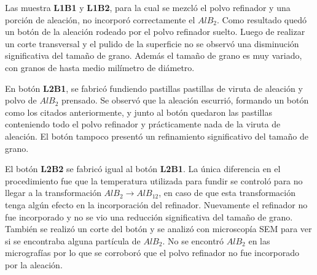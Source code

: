 \documentclass[a4paper,12pt,fleqn,twoside,openany]{book}
\begin{document}
Las muestra\textbf{ L1B1} y \textbf{L1B2}, para la cual se mezcló el polvo refinador y una porción de aleación, no incorporó correctamente el $AlB_2$. Como resultado quedó un botón de la aleación rodeado por el polvo refinador suelto. Luego de realizar un corte transversal y el pulido de la superficie no se observó una disminución significativa del tamaño de grano. Además el tamaño de grano es muy variado, con granos de hasta medio milímetro de diámetro.  

En botón \textbf{L2B1}, se fabricó fundiendo pastillas pastillas de viruta de aleación y polvo de $AlB_2$ prensado. Se observó que la aleación escurrió, formando un botón como los citados anteriormente, y junto al botón quedaron las pastillas conteniendo todo el polvo refinador y prácticamente nada de la viruta de aleación. El botón tampoco presentó un refinamiento significativo del tamaño de grano.

El botón \textbf{L2B2} se fabricó igual al botón \textbf{L2B1}. La única diferencia en el procedimiento fue que la temperatura utilizada para fundir se controló para no llegar a la transformación $AlB_2 \rightarrow AlB_{12}$, en caso de que esta transformación tenga algún efecto en la incorporación del refinador. Nuevamente el refinador no fue incorporado y no se vio una reducción significativa del tamaño de grano. También se realizó un corte del botón y se analizó con microscopía SEM para ver si se encontraba alguna partícula de $AlB_2$. No se encontró $AlB_2$ en las micrografías por lo que se corroboró que el polvo refinador no fue incorporado por la aleación.
\end{document}
